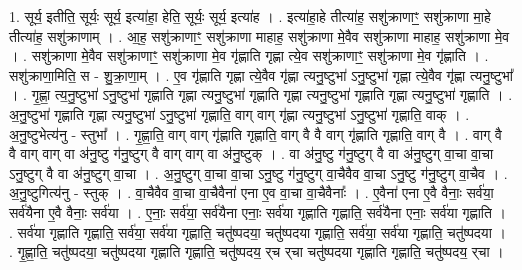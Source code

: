 \documentclass[17pt]{extarticle}
\begin{document}
1. सूर्य॒ इतीति॒ सूर्यः॒ सूर्य॒ इत्या॑हा॒ हेति॒ सूर्यः॒ सूर्य॒ इत्या॑ह । . इत्या॑हा॒हे तीत्या॑ह॒ सशु॑क्राणाꣳ॒॒ सशु॑क्राणा मा॒हे तीत्या॑ह॒ सशु॑क्राणाम् । . आ॒ह॒ सशु॑क्राणाꣳ॒॒ सशु॑क्राणा माहाह॒ सशु॑क्राणा मे॒वैव सशु॑क्राणा माहाह॒ सशु॑क्राणा मे॒व । . सशु॑क्राणा मे॒वैव सशु॑क्राणाꣳ॒॒ सशु॑क्राणा मे॒व गृ॑ह्णाति गृह्णा त्ये॒व सशु॑क्राणाꣳ॒॒ सशु॑क्राणा मे॒व गृ॑ह्णाति । . सशु॑क्राणा॒मिति॒ स - शु॒क्रा॒णा॒म् । . ए॒व गृ॑ह्णाति गृह्णा त्ये॒वैव गृ॑ह्णा त्यनु॒ष्टुभा॑ ऽनु॒ष्टुभा॑ गृह्णा त्ये॒वैव गृ॑ह्णा त्यनु॒ष्टुभा᳚ । . गृ॒ह्णा॒ त्य॒नु॒ष्टुभा॑ ऽनु॒ष्टुभा॑ गृह्णाति गृह्णा त्यनु॒ष्टुभा॑ गृह्णाति गृह्णा त्यनु॒ष्टुभा॑ गृह्णाति गृह्णा त्यनु॒ष्टुभा॑ गृह्णाति । . अ॒नु॒ष्टुभा॑ गृह्णाति गृह्णा त्यनु॒ष्टुभा॑ ऽनु॒ष्टुभा॑ गृह्णाति॒ वाग् वाग् गृ॑ह्णा त्यनु॒ष्टुभा॑ ऽनु॒ष्टुभा॑ गृह्णाति॒ वाक् । . अ॒नु॒ष्टुभेत्य॑नु - स्तुभा᳚ । . गृ॒ह्णा॒ति॒ वाग् वाग् गृ॑ह्णाति गृह्णाति॒ वाग् वै वै वाग् गृ॑ह्णाति गृह्णाति॒ वाग् वै । . वाग् वै वै वाग् वाग् वा अ॑नु॒ष्टु ग॑नु॒ष्टुग् वै वाग् वाग् वा अ॑नु॒ष्टुक् । . वा अ॑नु॒ष्टु ग॑नु॒ष्टुग् वै वा अ॑नु॒ष्टुग् वा॒चा वा॒चा ऽनु॒ष्टुग् वै वा अ॑नु॒ष्टुग् वा॒चा । . अ॒नु॒ष्टुग् वा॒चा वा॒चा ऽनु॒ष्टु ग॑नु॒ष्टुग् वा॒चैवैव वा॒चा ऽनु॒ष्टु ग॑नु॒ष्टुग् वा॒चैव । . अ॒नु॒ष्टुगित्य॑नु - स्तुक् । . वा॒चैवैव वा॒चा वा॒चैवैना॑ एना ए॒व वा॒चा वा॒चैवैनाः᳚ । . ए॒वैना॑ एना ए॒वै वैनाः॒ सर्व॑या॒ सर्व॑यैना ए॒वै वैनाः॒ सर्व॑या । . ए॒नाः॒ सर्व॑या॒ सर्व॑यैना एनाः॒ सर्व॑या गृह्णाति गृह्णाति॒ सर्व॑यैना एनाः॒ सर्व॑या गृह्णाति । . सर्व॑या गृह्णाति गृह्णाति॒ सर्व॑या॒ सर्व॑या गृह्णाति॒ चतु॑ष्पदया॒ चतु॑ष्पदया गृह्णाति॒ सर्व॑या॒ सर्व॑या गृह्णाति॒ चतु॑ष्पदया । . गृ॒ह्णा॒ति॒ चतु॑ष्पदया॒ चतु॑ष्पदया गृह्णाति गृह्णाति॒ चतु॑ष्पदय॒ र्‌च र्‌चा चतु॑ष्पदया गृह्णाति गृह्णाति॒ चतु॑ष्पदय॒ र्‌चा । \newline
\end{document}
